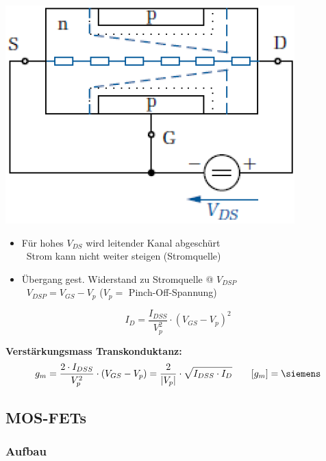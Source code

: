 \begin{minipage}[t]{0.3\columnwidth}
    \includegraphics[align=t, width=\columnwidth]{images/fet_aufbau_saettigung.png}
\end{minipage}
\hfill
\begin{minipage}[t]{0.68\columnwidth}
    \begin{itemize}
        \item Für hohes $V_{DS}$ wird leitender Kanal abgeschürt \\
            \textrightarrow\ Strom kann nicht weiter steigen (Stromquelle)
        \item Übergang gest. Widerstand zu Stromquelle @ $V_{DSP}$ \\
        \textrightarrow\ $V_{DSP} = V_{GS} - V_p$ ($V_p =$ Pinch-Off-Spannung)
    \end{itemize}

    $$ I_D = \frac{ I_{DSS}}{V_p^2} \cdot ( V_{GS} - V_p )^2 $$
\end{minipage}

\vspace{0.2cm}
\textbf{Verstärkungsmass Transkonduktanz:}
$$ g_m = \frac{ 2 \cdot I_{DSS}}{V_p^2} \cdot ( V_{GS} - V_p ) = \frac{2}{| V_p |} \cdot \sqrt{I_{DSS} \cdot I_D} \qquad [g_m] = \siemens $$


\subsection{MOS-FETs}

\subsubsection{Aufbau}

